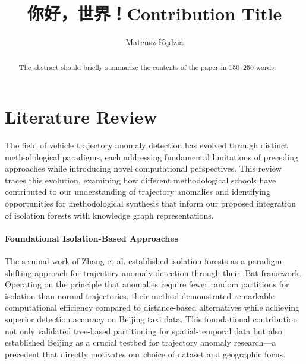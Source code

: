 \documentclass[runningheads]{llncs}
\newcommand{\zh}[1]{{\chinesefont #1}}
\begin{document}

\title{ \zh{你好，世界！}Contribution Title}
%
%
\author{Mateusz Kędzia}
%
\authorrunning{ \zh{你好，世界！} Author et al.}
%
%
\maketitle      %
%
\begin{abstract}
The abstract should briefly summarize the contents of the paper in
150--250 words.

\end{abstract}
%
%
\newpage

\section{Literature Review}
\label{sec:literature-review}

The field of vehicle trajectory anomaly detection has evolved through distinct methodological paradigms, each addressing fundamental limitations of preceding approaches while introducing novel computational perspectives. This review traces this evolution, examining how different methodological schools have contributed to our understanding of trajectory anomalies and identifying opportunities for methodological synthesis that inform our proposed integration of isolation forests with knowledge graph representations.

\paragraph{Foundational Isolation-Based Approaches}
The seminal work of Zhang et al. \cite{zhang2011ibat} established isolation forests as a paradigm-shifting approach for trajectory anomaly detection through their iBat framework. Operating on the principle that anomalies require fewer random partitions for isolation than normal trajectories, their method demonstrated remarkable computational efficiency compared to distance-based alternatives while achieving superior detection accuracy on Beijing taxi data. This foundational contribution not only validated tree-based partitioning for spatial-temporal data but also established Beijing as a crucial testbed for trajectory anomaly research—a precedent that directly motivates our choice of dataset and geographic focus.
\end{document}
